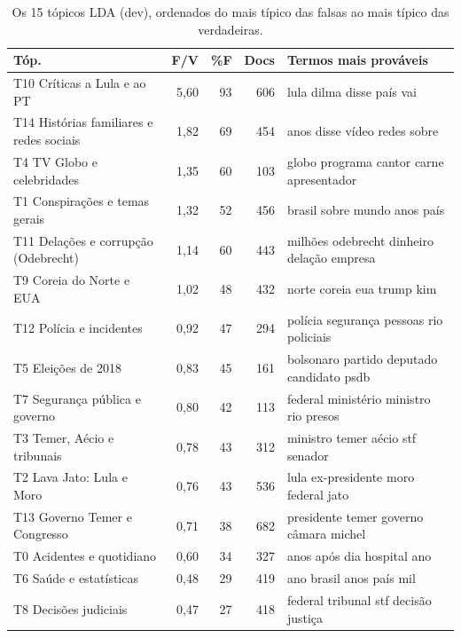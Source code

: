 \begin{table}[t]\centering\scriptsize
\caption{Os 15 tópicos LDA (dev), ordenados do mais típico das falsas ao mais típico das verdadeiras.}\label{tab:topics}
\begin{tabular}{lrrrp{4.6cm}}
\toprule
Tóp. & F/V & \%F & Docs & Termos mais prováveis \\
\midrule
T10 Críticas a Lula e ao PT & 5,60 & 93 & 606 & lula dilma disse país vai \\
T14 Histórias familiares e redes sociais & 1,82 & 69 & 454 & anos disse vídeo redes sobre \\
T4 TV Globo e celebridades & 1,35 & 60 & 103 & globo programa cantor carne apresentador \\
T1 Conspirações e temas gerais & 1,32 & 52 & 456 & brasil sobre mundo anos país \\
T11 Delações e corrupção (Odebrecht) & 1,14 & 60 & 443 & milhões odebrecht dinheiro delação empresa \\
T9 Coreia do Norte e EUA & 1,02 & 48 & 432 & norte coreia eua trump kim \\
T12 Polícia e incidentes & 0,92 & 47 & 294 & polícia segurança pessoas rio policiais \\
T5 Eleições de 2018 & 0,83 & 45 & 161 & bolsonaro partido deputado candidato psdb \\
T7 Segurança pública e governo & 0,80 & 42 & 113 & federal ministério ministro rio presos \\
T3 Temer, Aécio e tribunais & 0,78 & 43 & 312 & ministro temer aécio stf senador \\
T2 Lava Jato: Lula e Moro & 0,76 & 43 & 536 & lula ex-presidente moro federal jato \\
T13 Governo Temer e Congresso & 0,71 & 38 & 682 & presidente temer governo câmara michel \\
T0 Acidentes e quotidiano & 0,60 & 34 & 327 & anos após dia hospital ano \\
T6 Saúde e estatísticas & 0,48 & 29 & 419 & ano brasil anos país mil \\
T8 Decisões judiciais & 0,47 & 27 & 418 & federal tribunal stf decisão justiça \\
\bottomrule
\end{tabular}\par{}
\end{table}
